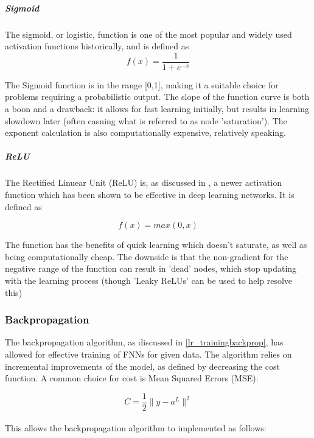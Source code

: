 \documentclass[a4paper,latin]{paper}
\begin{document}
\subparagraph{Sigmoid}

The sigmoid, or logistic, function is one of the most popular and widely used activation functions historically, and is defined as 
\begin{equation}\label{func_sigmoid}
f(x) = \frac{1}{1 + e^{-x}}
\end{equation}

The Sigmoid function is in the range [0,1], making it a suitable choice for problems requiring a probabilistic output. The slope of the function curve is both a boon and a drawback: it allows for fast learning initially, but results in learning slowdown later (often casuing what is referred to as node 'saturation'). The exponent calculation is also computationally expensive, relatively speaking.

\subparagraph{ReLU}

The Rectified Linuear Unit (ReLU) is, as discussed in , a newer activation function which has been shown to be effective in deep learning networks. It is defined as

\begin{equation}\label{func_relu}
f(x) = max(0, x)
\end{equation}

The function has the benefits of quick learning which doesn't saturate, as well as being computationally cheap. The downside is that the non-gradient for the negative range of the function can result in 'dead' nodes, which stop updating with the learning process (though 'Leaky ReLUs' can be used to help resolve this)

\subsubsection{Backpropagation}\label{imp_backprop}

The backpropagation algorithm, as discussed in \ref{lr_trainingbackprop}, has allowed for effective training of FNNs for given data. The algorithm relies on incremental improvements of the model, as defined by decreasing the cost function. A common choice for cost is Mean Squared Errors (MSE):

\begin{equation}\label{function_MSE}
C = \frac{1}{2} \rVert y - a^L \rVert^2
\end{equation}
~\\
This allows the backpropagation algorithm to implemented as follows:
\end{document}
